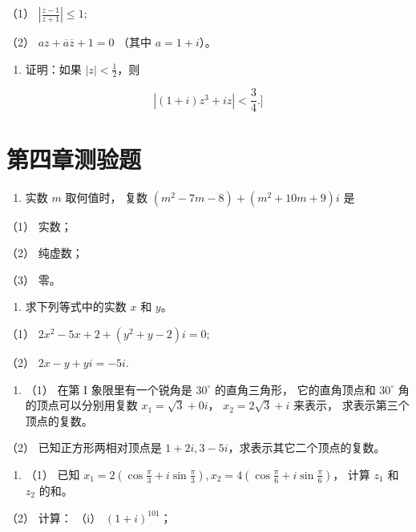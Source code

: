 （1） \(\left|\frac{z-1}{z+1}\right|\leqslant1;\)

（2） \(az + \overline{a}\overline{z} + 1 = 0\) （其中 \(a = 1 + i\)）。

\begin{enumerate}[start=18]
\item
  证明：如果 \(|z| < \frac{1}{2}\)，则
\end{enumerate}

\[
\left| (1 + i) z ^ {3} + i z \right| < \frac {3}{4}. ]
\]

\section{第四章测验题}

\begin{enumerate}
\item
  实数 \(m\) 取何值时， 复数 \((m^2 - 7m - 8) + (m^2 + 10m + 9)i\) 是
\end{enumerate}

（1） 实数；

（2） 纯虚数；

（3） 零。

\begin{enumerate}[start=2]
\item
  求下列等式中的实数 \(x\) 和 \(y\)。
\end{enumerate}

（1） \(2x^{2} - 5x + 2 + (y^{2} + y - 2)i = 0;\)

（2） \(2x - y + yi = -5i.\)

\begin{enumerate}[start=3]
\item
  （1） 在第 I 象限里有一个锐角是 \(30^{\circ}\) 的直角三角形，
  它的直角顶点和 \(30^{\circ}\) 角的顶点可以分别用复数
  \(x_{1} = \sqrt{3} + 0i\)， \(x_{2} = 2\sqrt{3} + i\) 来表示，
  求表示第三个顶点的复数。
\end{enumerate}

（2） 已知正方形两相对顶点是
\(1 + 2i, 3 - 5i\)，求表示其它二个顶点的复数。

\begin{enumerate}[start=4]
\item
  （1） 已知
  \(x_{1} = 2\left(\cos \frac{\pi}{3} + i \sin \frac{\pi}{3}\right), x_{2} = 4\left(\cos \frac{\pi}{6} + i \sin \frac{\pi}{6}\right)\)，
  计算 \(z_{1}\) 和 \(z_{2}\) 的和。
\end{enumerate}

（2） 计算： （i） \((1 + i)^{101}\)；

